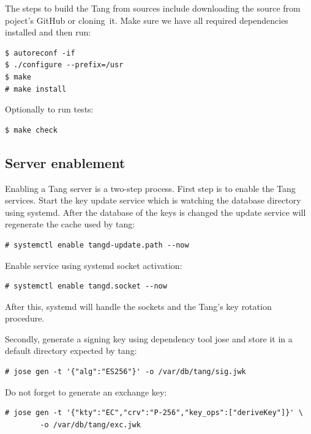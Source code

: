 The steps to build the Tang from sources include downloading the source from poject's GitHub or cloning~it.
Make sure we have all required dependencies installed and then run:
\begin{lstlisting}[columns=fixed,basicstyle=\ttfamily\footnotesize,tabsize=4,backgroundcolor=\color{yellow!10}]
$ autoreconf -if
$ ./configure --prefix=/usr
$ make
# make install
\end{lstlisting}
Optionally to run tests:
\begin{lstlisting}[columns=fixed,basicstyle=\ttfamily\footnotesize,tabsize=4,backgroundcolor=\color{yellow!10}]
$ make check
\end{lstlisting}



\subsection{Server enablement}

Enabling a Tang server is a two-step process.
First step is to enable the Tang services.
Start the key update service which is watching the database directory using systemd.
After the database of the keys is changed the update service will regenerate the cache used by tang:
\begin{lstlisting}[columns=fixed,basicstyle=\ttfamily\footnotesize,tabsize=4,backgroundcolor=\color{yellow!10}]
# systemctl enable tangd-update.path --now
\end{lstlisting}
Enable service using systemd socket activation:
\begin{lstlisting}[columns=fixed,basicstyle=\ttfamily\footnotesize,tabsize=4,backgroundcolor=\color{yellow!10}]
# systemctl enable tangd.socket --now
\end{lstlisting}
After this, systemd will handle the sockets and the Tang's key rotation procedure.

Secondly, generate a signing key using dependency tool jose and store it in a default directory expected by tang:
\begin{lstlisting}[columns=fixed,basicstyle=\ttfamily\footnotesize,tabsize=4,backgroundcolor=\color{yellow!10}]
# jose gen -t '{"alg":"ES256"}' -o /var/db/tang/sig.jwk
\end{lstlisting}
Do not forget to generate an exchange key:
\begin{lstlisting}[columns=fixed,basicstyle=\ttfamily\footnotesize,tabsize=4,backgroundcolor=\color{yellow!10}]
# jose gen -t '{"kty":"EC","crv":"P-256","key_ops":["deriveKey"]}' \
        -o /var/db/tang/exc.jwk
\end{lstlisting}

